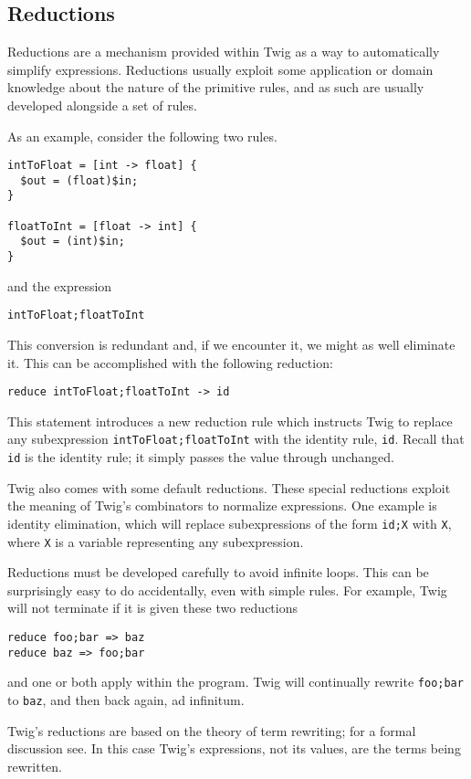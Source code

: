 \subsection{Reductions}
\label{sec:reductions}

Reductions are a mechanism provided within Twig as a way to automatically simplify expressions. Reductions usually exploit some application or domain knowledge about the nature of the primitive rules, and as such are usually developed alongside a set of rules.

As an example, consider the following two rules.

\begin{verbatim}
intToFloat = [int -> float] {
  $out = (float)$in;
}

floatToInt = [float -> int] {
  $out = (int)$in;
}
\end{verbatim}

and the expression

\begin{verbatim}
intToFloat;floatToInt
\end{verbatim}

This conversion is redundant and, if we encounter it, we might as well eliminate it. This can be accomplished with the following reduction:

\begin{verbatim}
reduce intToFloat;floatToInt -> id
\end{verbatim}

This statement introduces a new reduction rule which instructs Twig to replace any subexpression \texttt{intToFloat;floatToInt} with the identity rule, \texttt{id}. Recall that \texttt{id} is the identity rule; it simply passes the value through unchanged.

Twig also comes with some default reductions. These special reductions exploit the meaning of Twig's combinators to normalize expressions. One example is identity elimination, which will replace subexpressions of the form \texttt{id;X} with \texttt{X}, where \texttt{X} is a variable representing any subexpression.

Reductions must be developed carefully to avoid infinite loops. This can be surprisingly easy to do accidentally, even with simple rules. For example, Twig will not terminate if it is given these two reductions

\begin{verbatim}
reduce foo;bar => baz
reduce baz => foo;bar
\end{verbatim}

and one or both apply within the program. Twig will continually rewrite \texttt{foo;bar} to \texttt{baz}, and then back again, ad infinitum.

Twig's reductions are based on the theory of term rewriting; for a formal discussion see\cite{baader98rewriting}. In this case Twig's expressions, not its values, are the terms being rewritten.
